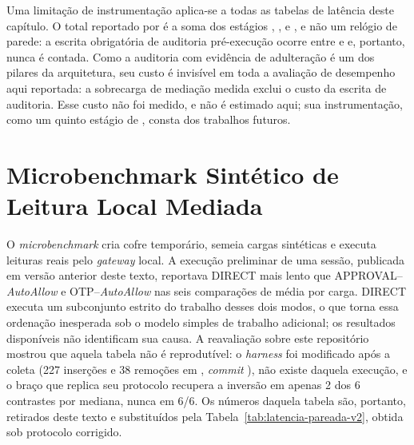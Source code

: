 Uma limitação de instrumentação aplica-se a todas as tabelas de latência deste capítulo. O total reportado por  é a soma dos estágios , ,  e , e não um relógio de parede: a escrita obrigatória de auditoria pré-execução ocorre entre  e  e, portanto, nunca é contada. Como a auditoria com evidência de adulteração é um dos pilares da arquitetura, seu custo é invisível em toda a avaliação de desempenho aqui reportada: a sobrecarga de mediação medida exclui o custo da escrita de auditoria. Esse custo não foi medido, e não é estimado aqui; sua instrumentação, como um quinto estágio de , consta dos trabalhos futuros.

\section{Microbenchmark Sintético de Leitura Local Mediada}
O \textit{microbenchmark} cria cofre temporário, semeia cargas sintéticas e executa leituras reais pelo \textit{gateway} local. A execução preliminar de uma sessão, publicada em versão anterior deste texto, reportava DIRECT mais lento que APPROVAL--\textit{AutoAllow} e OTP--\textit{AutoAllow} nas seis comparações de média por carga. DIRECT executa um subconjunto estrito do trabalho desses dois modos, o que torna essa ordenação inesperada sob o modelo simples de trabalho adicional; os resultados disponíveis não identificam sua causa. A reavaliação sobre este repositório mostrou que aquela tabela não é reprodutível: o \textit{harness} foi modificado após a coleta (227 inserções e 38 remoções em , \textit{commit} ), não existe  daquela execução, e o braço que replica seu protocolo recupera a inversão em apenas 2 dos 6 contrastes por mediana, nunca em 6/6. Os números daquela tabela são, portanto, retirados deste texto e substituídos pela Tabela~\ref{tab:latencia-pareada-v2}, obtida sob protocolo corrigido.

